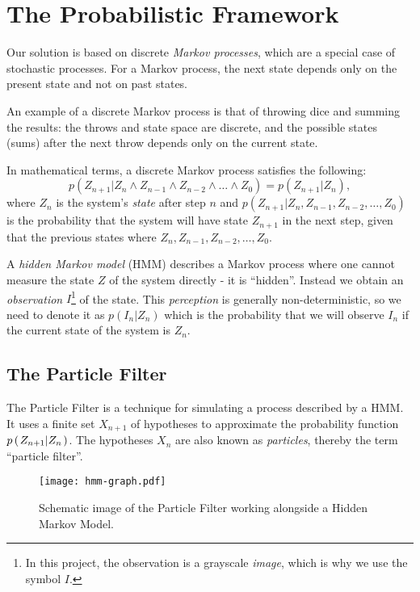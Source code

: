 \section*{The Probabilistic Framework}
Our solution is based on discrete \emph{Markov processes}, which are a special case of stochastic processes. For a Markov process, the next state depends only on the present state and not on past states.

An example of a discrete Markov process is that of throwing dice and summing the results: the throws and state space are discrete, and the possible states (sums) after the next throw depends only on the current state.

In mathematical terms, a discrete Markov process satisfies the following:
\begin{equation}
 p\left(Z_{n+1}|Z_n \wedge Z_{n-1} \wedge Z_{n-2} \wedge \dots \wedge Z_0\right) = p\left(Z_{n+1}|Z_n\right),
\end{equation}
where $Z_n$ is the system's \emph{state} after step $n$ and $p\left(Z_{n+1}|Z_n, Z_{n-1}, Z_{n-2}, \dots, Z_0\right)$ is the probability that the system will have state $Z_{n+1}$ in the next step, given that the previous states where $Z_n, Z_{n-1}, Z_{n-2}, \dots, Z_0$.

A \emph{hidden Markov model} (HMM) describes a Markov process where one cannot measure the state $Z$ of the system directly - it is ``hidden''. Instead we obtain an \emph{observation} $I$\footnote{In this project, the observation is a grayscale \emph{image}, which is why we use the symbol $I$.}  of the state. This \emph{perception} is generally non-deterministic, so we need to denote it as $p(I_n|Z_n)$ which is the probability that we will observe $I_n$ if the current state of the system is $Z_n$.

\subsection*{The Particle Filter}
The Particle Filter is a technique for simulating a process described by a HMM. It uses a finite set $X_{n+1}$ of hypotheses to approximate the probability function $p\left(\left. Z_{n+1} \middle\vert Z_n \right.\right)$. The hypotheses $X_n$ are also known as \emph{particles}, thereby the term ``particle filter''.

\begin{figure}
  \centering
  \texttt{[image: hmm-graph.pdf]}
  \caption{Schematic image of the Particle Filter working alongside a Hidden Markov Model.}
  \label{fig:hmm-graph}
\end{figure}

